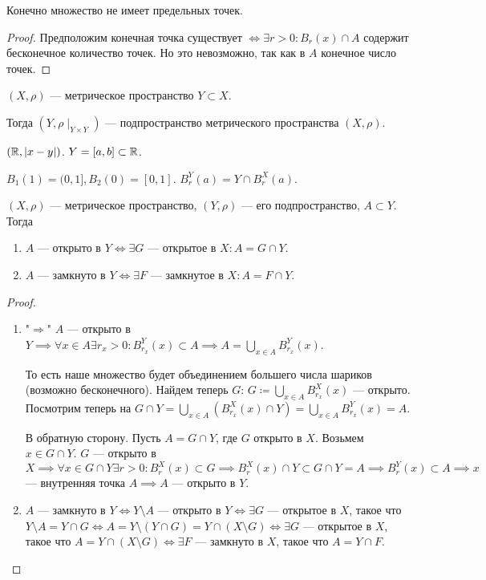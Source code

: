 \begin{consequence}
     Конечно множество не имеет предельных точек.
\end{consequence}
\begin{proof}
     Предположим конечная точка существует $\iff \exists r > 0\!: B_r(x) \cap A$ содержит бесконечное количество точек. Но это невозможно, так как в $A$ конечное число точек. 
\end{proof}

\begin{definition}
     $(X, \rho)$ --- метрическое пространство  $Y \subset X$.

     Тогда  $(Y, \rho \mid_{Y \times Y})$ --- подпространство метрического пространства  $(X, \rho)$.
\end{definition}
\begin{example}
     $(\mathbb{R}, |x-y|)$.  $Y=[a, b] \subset \mathbb{R}$.

      $B_1(1) = (0, 1], B_2(0) = [0, 1]$.  $B_r^Y(a) = Y \cap B_r^X(a)$.
\end{example}
\begin{theorem}
     $(X, \rho)$ --- метрическое пространство,  $(Y, \rho)$ --- его подпространство,  $A \subset Y$. Тогда
      \begin{enumerate}
          \item $A$ --- открыто в  $Y \iff \exists G$ --- открытое в  $X\!: A = G \cap Y$. 
          \item $A$ --- замкнуто в  $Y \iff \exists F$ --- замкнутое в  $X\!: A = F \cap Y$.
     \end{enumerate}
\end{theorem}
\begin{proof}
     \slashn
     \begin{enumerate}
         \item "$\Rightarrow$" $A$ --- открыто в  $Y \implies \forall x \in A \exists r_x > 0 \!: B_{r_x}^Y(x) \subset A \implies A = \bigcup\limits_{x \in A}B_{r_x}^Y(x)$.

             То есть наше множество будет объединением большего числа шариков (возможно бесконечного). Найдем теперь  $G$:  $G \coloneqq \bigcup\limits_{x \in A} B_{r_x}^X(x)$ --- открыто. Посмотрим теперь на  $G \cap Y = \bigcup\limits_{x \in A}(B_{r_x}^X(x) \cap Y) = \bigcup\limits_{x \in A}B_{r_x}^Y(x) = A$.

         В обратную сторону. Пусть $A = G \cap Y$, где  $G$ открыто в  $X$. Возьмем  $x \in G \cap Y$.  $G$ --- открыто в  $X \implies \forall x \in G \cap Y \exists r > 0\!: B_r^X(x) \subset G \implies B_r^X(x) \cap Y \subset G \cap Y = A \implies B_r^Y(x) \subset A \implies x$ --- внутренняя точка $A \implies A$ --- открыто в  $Y$. 

         \item $A$ --- замкнуто в $Y \iff Y \setminus A$ --- открыто в  $Y \iff \exists G$ --- открытое в  $X$, такое что  $Y \setminus A = Y \cap G \iff A = Y \setminus (Y \cap G) = Y \cap (X \setminus G) \iff \exists G$ --- открытое в  $X$, такое что  $A = Y \cap (X \setminus G) \iff \exists F$ --- замкнуто в  $X$, такое что  $A = Y \cap F$.
     \end{enumerate}
\end{proof}
